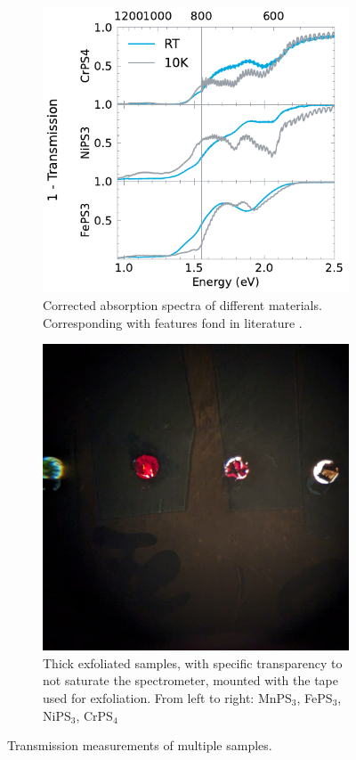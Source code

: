 \documentclass[
	twoside,
	parskip=half,
	a4paper,
]{scrbook}
\begin{document}
\begin{figure}
	\centering
	\begin{subfigure}[c]{3.5in}
		\vskip 0pt
		\includegraphics{../figures/2024-03-15 Absorbance.pdf}
		\caption{Corrected absorption spectra of different materials. Corresponding with features fond in literature \cite{CrPS4_transmission, NiPS3_transmission, FePS3_transmission}.}
		\label{fig:transmission}
	\end{subfigure}
	\begin{subfigure}[c]{1.5in}
		\vskip 0pt
		\includegraphics[width=\textwidth]{../../photos/transmission samples.jpg}
	\caption{Thick exfoliated samples, with specific transparency to not saturate the spectrometer, mounted with the tape used for exfoliation. From left to right: MnPS$_3$, FePS$_3$, NiPS$_3$, CrPS$_4$}
	\label{fig:transmission samples}
	\end{subfigure}
	\caption{Transmission measurements of multiple samples.}
\end{figure}
\end{document}
